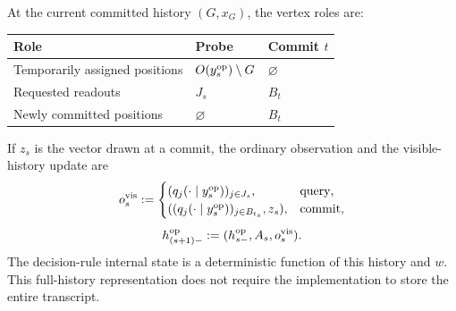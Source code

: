 \begin{definition}[\textcolor{red}{Admissible algorithms}]
\begin{samepage}
At the current committed history $(G,x_G)$,
the vertex roles are:
\begin{center}
\begin{tabular}{@{}lll@{}}
\toprule
Role & Probe & Commit $t$\\
\midrule
Temporarily assigned positions
 & $\ObservedSet{\OpSubmittedState{s}}\setminus G$ & $\varnothing$\\
Requested readouts & $J_s$ & $B_t$\\
Newly committed positions & $\varnothing$ & $B_t$\\
\bottomrule
\end{tabular}
\end{center}
\end{samepage}
If $z_s$ is the vector drawn at a commit, the ordinary observation and
the visible-history update are
\begin{equation}
 \OpVisibleObservation{s}:=
 \begin{cases}
  (\OracleRow{\OpSubmittedState{s}}{j})_{j\in J_s},
    &\text{query},\\
  ((\OracleRow{\OpSubmittedState{s}}{j})_{j\in B_{t_s}},z_s),
    &\text{commit},
 \end{cases}
 \label{app:eq:operation-visible-observation}
\end{equation}
\begin{equation}
 \OpVisibleHistory{(s+1)}
 :=(\OpVisibleHistory{s},A_s,\OpVisibleObservation{s}).
 \label{app:eq:operation-visible-history}
\end{equation}
The decision-rule internal state is a deterministic function of this
history and $w$. This full-history representation does not require the
implementation to store the entire transcript.
\end{definition}

